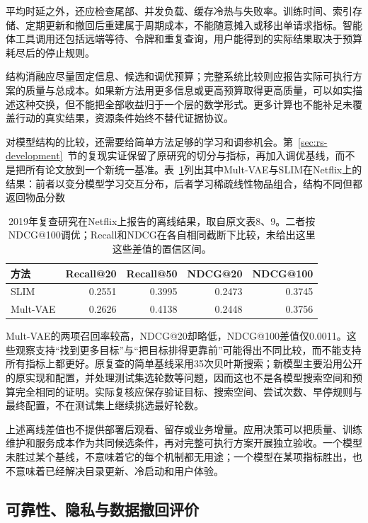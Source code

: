平均时延之外，还应检查尾部、并发负载、缓存冷热与失败率。训练时间、索引存储、定期更新和撤回后重建属于周期成本，不能随意摊入或移出单请求指标。智能体工具调用还包括远端等待、令牌和重复查询，用户能得到的实际结果取决于预算耗尽后的停止规则。

结构消融应尽量固定信息、候选和调优预算；完整系统比较则应报告实际可执行方案的质量与总成本。如果新方法用更多信息或更高预算取得更高质量，可以如实描述这种交换，但不能把全部收益归于一个层的数学形式。更多计算也不能补足未覆盖行动的真实结果，资源条件始终不替代证据协议。

对模型结构的比较，还需要给简单方法足够的学习和调参机会。第~\ref{sec:rs-development}~节的复现实证保留了原研究的切分与指标，再加入调优基线，而不是把所有论文放到一个新统一基准。表~\ref{tab:rs-evaluation-baseline-reproduction}列出其中Mult-VAE与SLIM在Netflix上的结果：前者以变分模型学习交互分布，后者学习稀疏线性物品组合，结构不同但都返回物品分数

\begin{table}[htbp]
 \centering
 \small
 \begin{tabular}{@{}lrrrr@{}}
  \toprule
  方法 & Recall@20 & Recall@50 & NDCG@20 & NDCG@100\\
  \midrule
  SLIM & 0.2551 & 0.3995 & 0.2473 & 0.3745\\
  Mult-VAE & 0.2626 & 0.4138 & 0.2448 & 0.3756\\
  \bottomrule
 \end{tabular}
 \caption{2019年复查研究在Netflix上报告的离线结果，取自原文表8、9。二者按NDCG@100调优；Recall和NDCG在各自相同截断下比较，未给出这里这些差值的置信区间。}
 \label{tab:rs-evaluation-baseline-reproduction}
\end{table}

Mult-VAE的两项召回率较高，NDCG@20却略低，NDCG@100差值仅0.0011。这些观察支持“找到更多目标”与“把目标排得更靠前”可能得出不同比较，而不能支持所有指标上都更好。原复查的简单基线采用35次贝叶斯搜索；新模型主要沿用公开的原实现和配置，并处理测试集选轮数等问题，因而这也不是各模型搜索空间和预算完全相同的证明。实际复核应保存验证目标、搜索空间、尝试次数、早停规则与最终配置，不在测试集上继续挑选最好轮数。

上述离线差值也不提供部署后观看、留存或业务增量。应用决策可以把质量、训练维护和服务成本作为共同候选条件，再对完整可执行方案开展独立验收。一个模型未胜过某个基线，不意味着它的每个机制都无用途；一个模型在某项指标胜出，也不意味着已经解决目录更新、冷启动和用户体验。

\subsection{可靠性、隐私与数据撤回评价}
\label{sec:rs-evaluation-protection}

